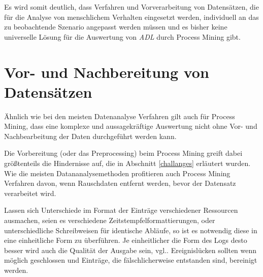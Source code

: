Es wird somit deutlich, dass Verfahren und Vorverarbeitung von Datensätzen, die für die Analyse von menschlichem Verhalten eingesetzt werden, individuell an das zu beobachtende Szenario angepasst werden müssen und es bisher keine universelle Lösung für die Auswertung von \textit{ADL} durch Process Mining gibt.


\section{Vor- und Nachbereitung von Datensätzen}
Ähnlich wie bei den meisten Datenanalyse Verfahren gilt auch für Process Mining, dass eine komplexe und aussagekräftige Auswertung nicht ohne Vor- und Nachbearbeitung der Daten durchgeführt werden kann.

Die Vorbereitung (oder das Preprocessing) beim Process Mining greift dabei größtenteils die Hindernisse auf, die in Abschnitt \ref{challanges} erläutert wurden. Wie die meisten Datananalysemethoden profitieren auch Process Mining Verfahren davon, wenn Rauschdaten entfernt werden, bevor der Datensatz verarbeitet wird. 

Lassen sich Unterschiede im Format der Einträge verschiedener Ressourcen ausmachen, seien es verschiedene Zeitstempfelformattierungen, oder unterschiedliche Schreibweisen für identische Abläufe, so ist es notwendig diese in eine einheitliche Form zu überführen. Je einheitlicher die Form des Logs desto besser wird auch die Qualität der Ausgabe sein, vgl.\cite{PMinAction}. Ereignislücken sollten wenn möglich geschlossen und Einträge, die fälschlicherweise entstanden sind, bereinigt werden.

